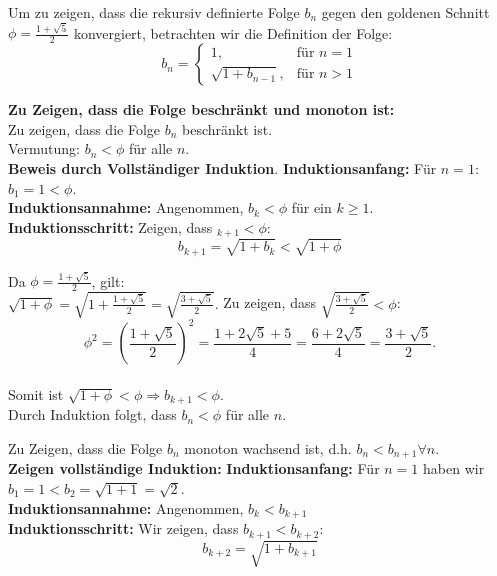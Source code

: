 \documentclass{beamer}
\begin{document}
\begin{frame}
 Um zu zeigen, dass die rekursiv definierte Folge $ b_n $ gegen den goldenen Schnitt $\phi = \frac{1 + \sqrt{5}}{2}$ konvergiert, betrachten wir die Definition der Folge:
$$
b_n = \begin{cases} 
1, & \text{für } n = 1 \\ 
\sqrt{1 + b_{n-1}}, & \text{für } n > 1 
\end{cases}
$$
\end{frame}

\begin{frame}
\textbf{Zu Zeigen, dass die Folge beschränkt und monoton ist:} \\
Zu zeigen, dass die Folge $ b_n$ beschränkt ist.  
\\ Vermutung: $ b_n < \phi $ für alle $ n $. \\
\textbf{Beweis durch Vollständiger Induktion}. 
\textbf{Induktionsanfang:} Für $ n = 1$: $ b_1 = 1 < \phi $. \\
\textbf{Induktionsannahme:} Angenommen, $ b_k < \phi $ für ein $ k \geq 1 .$ \\   
\textbf{Induktionsschritt:} Zeigen, dass $_{k+1} < \phi $:
$$
b_{k+1} = \sqrt{1 + b_k} < \sqrt{1 + \phi}
$$
\end{frame}

\begin{frame}
Da $ \phi = \frac{1 + \sqrt{5}}{2} $, gilt: \\
$
\sqrt{1 + \phi} = \sqrt{1 + \frac{1 + \sqrt{5}}{2}} = \sqrt{\frac{3 + \sqrt{5}}{2}}.
$
Zu zeigen, dass $\sqrt{\frac{3 + \sqrt{5}}{2}} < \phi $: \\

$$
\phi^2 = \left(\frac{1 + \sqrt{5}}{2}\right)^2 = \frac{1 + 2\sqrt{5} + 5}{4} = \frac{6 + 2\sqrt{5}}{4} = \frac{3 + \sqrt{5}}{2}.
$$ \\

Somit ist $ \sqrt{1 + \phi} < \phi \Rightarrow b_{k+1} < \phi $. \\

Durch Induktion folgt, dass $ b_n < \phi $ für alle $ n $. \\
\end{frame}

\begin{frame}
    Zu Zeigen, dass die Folge $ b_n $ monoton wachsend ist, d.h. $ b_n < b_{n+1} \forall n $. \\ 
    \textbf{Zeigen vollständige Induktion:}
    \textbf{Induktionsanfang:} Für $n = 1$ haben wir $ b_1 = 1 < b_2 = \sqrt{1 + 1} = \sqrt{2} .$ \\

\textbf{Induktionsannahme:} Angenommen, $ b_k < b_{k+1} $ \\

\textbf{Induktionsschritt:} Wir zeigen, dass $b_{k+1} < b_{k+2} :$ \\ 
$$
b_{k+2} = \sqrt{1 + b_{k+1}}
$$    
\end{frame}
\end{document}
